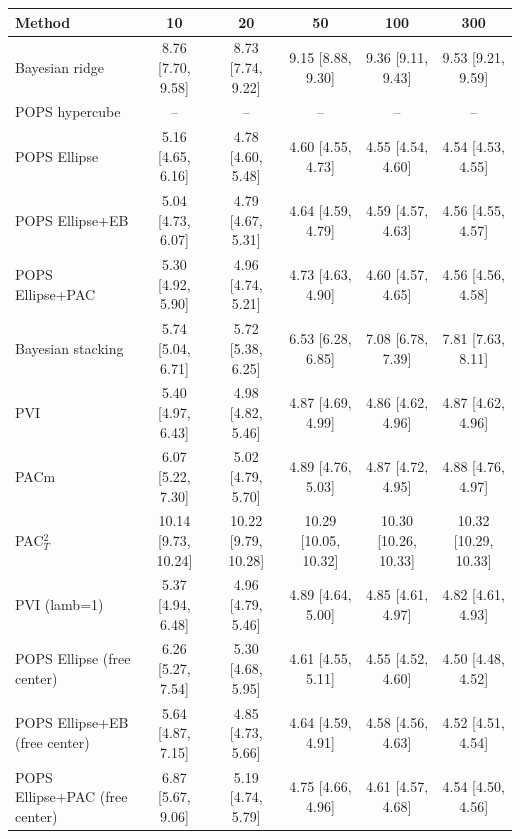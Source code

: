 \begin{tabular}{lccccc}
\toprule
Method & 10 & 20 & 50 & 100 & 300 \\
\midrule
Bayesian ridge & 8.76 {\scriptsize[7.70, 9.58]} & 8.73 {\scriptsize[7.74, 9.22]} & 9.15 {\scriptsize[8.88, 9.30]} & 9.36 {\scriptsize[9.11, 9.43]} & 9.53 {\scriptsize[9.21, 9.59]} \\
POPS hypercube & -- & -- & -- & -- & -- \\
POPS Ellipse & 5.16 {\scriptsize[4.65, 6.16]} & 4.78 {\scriptsize[4.60, 5.48]} & 4.60 {\scriptsize[4.55, 4.73]} & 4.55 {\scriptsize[4.54, 4.60]} & 4.54 {\scriptsize[4.53, 4.55]} \\
POPS Ellipse+EB & 5.04 {\scriptsize[4.73, 6.07]} & 4.79 {\scriptsize[4.67, 5.31]} & 4.64 {\scriptsize[4.59, 4.79]} & 4.59 {\scriptsize[4.57, 4.63]} & 4.56 {\scriptsize[4.55, 4.57]} \\
POPS Ellipse+PAC & 5.30 {\scriptsize[4.92, 5.90]} & 4.96 {\scriptsize[4.74, 5.21]} & 4.73 {\scriptsize[4.63, 4.90]} & 4.60 {\scriptsize[4.57, 4.65]} & 4.56 {\scriptsize[4.56, 4.58]} \\
Bayesian stacking & 5.74 {\scriptsize[5.04, 6.71]} & 5.72 {\scriptsize[5.38, 6.25]} & 6.53 {\scriptsize[6.28, 6.85]} & 7.08 {\scriptsize[6.78, 7.39]} & 7.81 {\scriptsize[7.63, 8.11]} \\
PVI & 5.40 {\scriptsize[4.97, 6.43]} & 4.98 {\scriptsize[4.82, 5.46]} & 4.87 {\scriptsize[4.69, 4.99]} & 4.86 {\scriptsize[4.62, 4.96]} & 4.87 {\scriptsize[4.62, 4.96]} \\
PACm & 6.07 {\scriptsize[5.22, 7.30]} & 5.02 {\scriptsize[4.79, 5.70]} & 4.89 {\scriptsize[4.76, 5.03]} & 4.87 {\scriptsize[4.72, 4.95]} & 4.88 {\scriptsize[4.76, 4.97]} \\
PAC$^2_T$ & 10.14 {\scriptsize[9.73, 10.24]} & 10.22 {\scriptsize[9.79, 10.28]} & 10.29 {\scriptsize[10.05, 10.32]} & 10.30 {\scriptsize[10.26, 10.33]} & 10.32 {\scriptsize[10.29, 10.33]} \\
PVI (lamb=1) & 5.37 {\scriptsize[4.94, 6.48]} & 4.96 {\scriptsize[4.79, 5.46]} & 4.89 {\scriptsize[4.64, 5.00]} & 4.85 {\scriptsize[4.61, 4.97]} & 4.82 {\scriptsize[4.61, 4.93]} \\
POPS Ellipse (free center) & 6.26 {\scriptsize[5.27, 7.54]} & 5.30 {\scriptsize[4.68, 5.95]} & 4.61 {\scriptsize[4.55, 5.11]} & 4.55 {\scriptsize[4.52, 4.60]} & 4.50 {\scriptsize[4.48, 4.52]} \\
POPS Ellipse+EB (free center) & 5.64 {\scriptsize[4.87, 7.15]} & 4.85 {\scriptsize[4.73, 5.66]} & 4.64 {\scriptsize[4.59, 4.91]} & 4.58 {\scriptsize[4.56, 4.63]} & 4.52 {\scriptsize[4.51, 4.54]} \\
POPS Ellipse+PAC (free center) & 6.87 {\scriptsize[5.67, 9.06]} & 5.19 {\scriptsize[4.74, 5.79]} & 4.75 {\scriptsize[4.66, 4.96]} & 4.61 {\scriptsize[4.57, 4.68]} & 4.54 {\scriptsize[4.50, 4.56]} \\
\bottomrule
\end{tabular}

